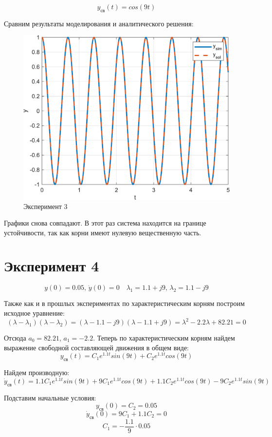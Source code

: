 \[y_{\text{св}}(t) = cos(9t)\]

Сравним результаты моделирования и аналитического решения:
\begin{figure}[H]
    \centering
    \includegraphics[width=1\textwidth, trim={0cm 0cm 0cm 0cm}]{../images/1_3.png}
    \caption{Эксперимент 3}
    \label{fig:exp3}
\end{figure}

Графики снова совпадают. В этот раз система находится на границе устойчивости, так как корни имеют нулевую вещественную часть.
\section{Эксперимент 4}
\[y(0) = 0.05,\, \dot y(0) = 0 \quad \lambda_1 = 1.1 + j9,\, \lambda_2 = 1.1 - j9\]

Также как и в прошлых экспериментах по характеристическим корням построим исходное уравнение:
\[(\lambda - \lambda_1)(\lambda - \lambda_2) = (\lambda - 1.1 - j9)(\lambda - 1.1 + j9) = \lambda^2 - 2.2\lambda + 82.21 = 0\]

Отсюда $a_0 = 82.21$, $a_1 = -2.2$. Теперь по характеристическим корням найдем выражение свободной составляющей движения в общем виде:
\[y_{\text{св}}(t) = C_1 e^{1.1 t} sin(9t) + C_2 e^{1.1 t} cos(9t)\]

Найдем производную:
\[\dot y_{\text{св}}(t) = 1.1C_1 e^{1.1 t} sin(9t) + 9C_1 e^{1.1 t} cos(9t) + 1.1C_2 e^{1.1 t} cos(9t) - 9C_2 e^{1.1 t} sin(9t)\]

Подставим начальные условия:
\[y_{\text{св}}(0) = C_2 = 0.05\]
\[\dot y_{\text{св}}(0) = 9C_1 + 1.1C_2 = 0\]
\[C_1 = -\frac{1.1}{9} \cdot 0.05\]

